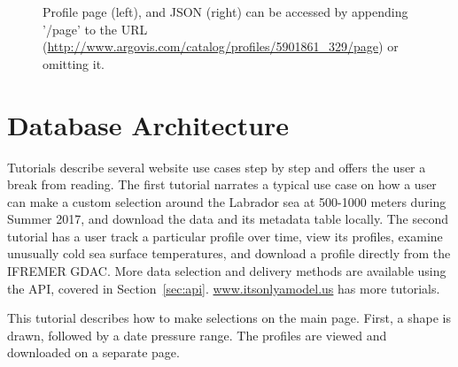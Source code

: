 \begin{figure}[H]
\begin{minipage}{6in}
\centering
{}
\caption{\label{fig:profile_data} Profile page (left), and JSON (right) can be accessed by appending '/page' to the URL (\url{http://www.argovis.com/catalog/profiles/5901861_329/page}) or omitting it.}
\end{minipage}
\end{figure}

\section{Database Architecture}

Tutorials describe several website use cases step by step and offers the user a break from reading. The first tutorial narrates a typical use case on how a user can make a custom selection around the Labrador sea at 500-1000 meters during Summer 2017, and download the data and its metadata table locally. The second tutorial has a user track a particular profile over time, view its profiles, examine unusually cold sea surface temperatures, and download a profile directly from the IFREMER GDAC. More data selection and delivery methods are available using the API, covered in Section~\ref{sec:api}. \url{www.itsonlyamodel.us} has more tutorials.



This tutorial describes how to make selections on the main page. First, a shape is drawn, followed by a date pressure range. The profiles are viewed and downloaded on a separate page.

